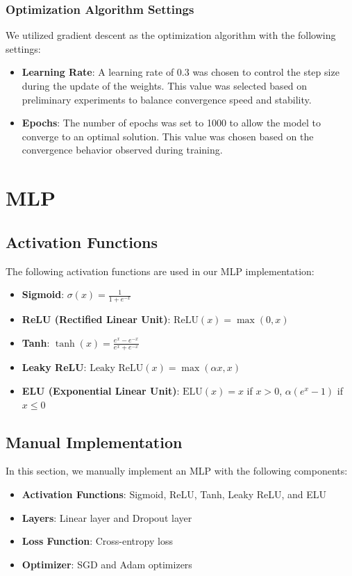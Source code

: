 \documentclass[a4paper,12pt]{article}
\begin{document}
\subsubsection{Optimization Algorithm Settings}
We utilized gradient descent as the optimization algorithm with the following settings:
\begin{itemize}
    \item \textbf{Learning Rate}: A learning rate of 0.3 was chosen to control the step size during the update of the weights. This value was selected based on preliminary experiments to balance convergence speed and stability.
    \item \textbf{Epochs}: The number of epochs was set to 1000 to allow the model to converge to an optimal solution. This value was chosen based on the convergence behavior observed during training.
\end{itemize}
\newpage

\section{MLP}

\subsection{Activation Functions}
The following activation functions are used in our MLP implementation:

\begin{itemize}
    \item \textbf{Sigmoid}: \( \sigma(x) = \frac{1}{1 + e^{-x}} \)
    \item \textbf{ReLU (Rectified Linear Unit)}: \( \text{ReLU}(x) = \max(0, x) \)
    \item \textbf{Tanh}: \( \tanh(x) = \frac{e^x - e^{-x}}{e^x + e^{-x}} \)
    \item \textbf{Leaky ReLU}: \( \text{Leaky ReLU}(x) = \max(\alpha x, x) \)
    \item \textbf{ELU (Exponential Linear Unit)}: \( \text{ELU}(x) = x \) if \( x > 0 \), \( \alpha (e^x - 1) \) if \( x \leq 0 \)
\end{itemize}

\subsection{Manual Implementation}
In this section, we manually implement an MLP with the following components:

\begin{itemize}
    \item \textbf{Activation Functions}: Sigmoid, ReLU, Tanh, Leaky ReLU, and ELU
    \item \textbf{Layers}: Linear layer and Dropout layer
    \item \textbf{Loss Function}: Cross-entropy loss
    \item \textbf{Optimizer}: SGD and Adam optimizers
\end{itemize}
\end{document}
